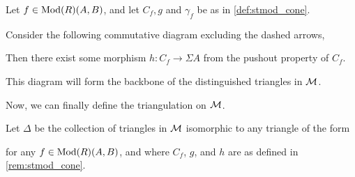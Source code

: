 \begin{remark}
    \label{rem:stmod_cone}
    Let \( f \in \operatorname{Mod}(R)(A, B) \), and let \( C_f, g \) and \( \gamma_f \) be as in \autoref{def:stmod_cone}.
    
    Consider the following commutative diagram excluding the dashed arrows,
    \begin{center}
    \end{center}
    Then there exist some morphism \( h: C_f \to \Sigma A \) from the pushout property of \( C_f \).

    This diagram will form the backbone of the distinguished triangles in \( {\mathcal{M}} \).
\end{remark}

Now, we can finally define the triangulation on \( {\mathcal{M}} \).

\begin{definition}
    \label{def:stmod_delta}
    Let \( \Delta \) be the collection of triangles in \( {\mathcal{M}} \) isomorphic to any triangle of the form
    \begin{center}
    \end{center}
    for any \( f \in \operatorname{Mod}(R)(A, B) \), and where \( C_f \), \( g \), and \( h \) are as defined in \autoref{rem:stmod_cone}.
\end{definition}

